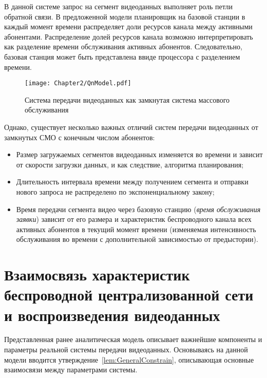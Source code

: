 В данной системе запрос на сегмент видеоданных выполняет роль петли обратной связи. В предложенной модели планировщик на базовой станции в каждый момент времени распределяет доли ресурсов канала между активными абонентами. Распределение долей ресурсов канала возможно интерпретировать как разделение времени обслуживания активных абонентов. Следовательно, базовая станция может быть представлена ввиде процессора с разделением времени.

\begin{figure}[htbp]
\begin{center}
\texttt{[image: Chapter2/QnModel.pdf]}
\caption{Система передачи видеоданных как замкнутая система массового обслуживания}
\label{fig:QnModel}
\end{center}
\end{figure}

Однако, существует несколько важных отличий систем передачи видеоданных от замкнутых СМО с конечным числом абонентов:
\begin{itemize}
	\item Размер загружаемых сегментов видеоданных изменяется во времени и зависит от скорости загрузки данных, и как следствие, алгоритма планирования;
	\item Длительность интервала времени между получением сегмента и отправки нового запроса не распределено по экспоненциальному закону;
	\item Время передачи сегмента видео через базовую станцию (\textit{время обслуживания заявки}) зависит от его размера и характеристик беспроводного канала всех активных абонентов в текущий момент времени (изменяемая интенсивность обслуживания во времени с дополнительной зависимостью от предыстории).
\end{itemize}


\section{Взаимосвязь характеристик беспроводной централизованной сети и воспроизведения видеоданных}
\label{chap2:InterrelationVideoParams}

Представленная ранее аналитическая модель описывает важнейшие компоненты и параметры реальной системы передачи видеоданных. Основываясь на данной модели вводится утверждение~\ref{lem:GeneralConstrain}, описывающая основные взаимосвязи между параметрами системы.

